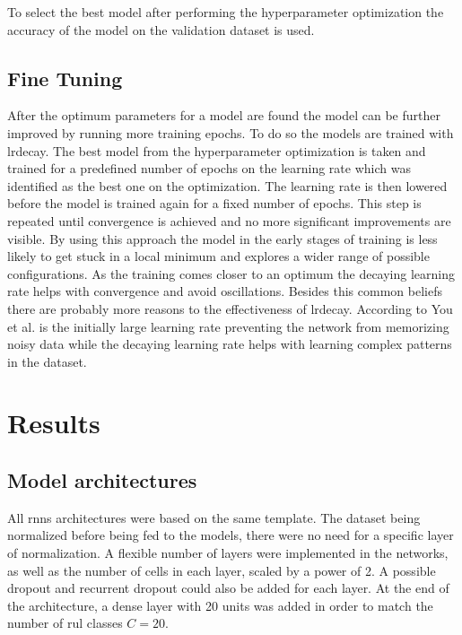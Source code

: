\documentclass[conference]{IEEEtran}
\begin{document}
To select the best model after performing the hyperparameter optimization the accuracy of the model on the validation dataset is used.

\noindent
\subsection{Fine Tuning}

After the optimum parameters for a model are found the model can be further improved by running more training epochs. To do so the models are trained with \gls{lrdecay}. The best model from the hyperparameter optimization is taken and trained for a predefined number of epochs on the learning rate which was identified as the best one on the optimization. The learning rate is then lowered before the model is trained again for a fixed number of epochs. This step is repeated until convergence is achieved and no more significant improvements are visible. By using this approach the model in the early stages of training is less likely to get stuck in a local minimum and explores a wider range of possible configurations. As the training comes closer to an optimum the decaying learning rate helps with convergence and avoid oscillations. Besides this common beliefs there are probably more reasons to the effectiveness of \gls{lrdecay}. According to You et al. \cite{You2019} is the initially large learning rate preventing the network from memorizing noisy data while the decaying learning rate helps with learning complex patterns in the dataset.


\section{Results}
\label{sec:results}


\noindent
\subsection{Model architectures}

All \glspl{rnn} architectures were based on the same template. The dataset being normalized before being fed to the models, there were no need for a specific layer of normalization. A flexible number of layers were implemented in the networks, as well as the number of cells in each layer, scaled by a power of 2. A possible dropout and recurrent dropout could also be added for each layer. At the end of the architecture, a dense layer with 20 units was added in order to match the number of \gls{rul} classes $ C = 20 $.  
\end{document}
